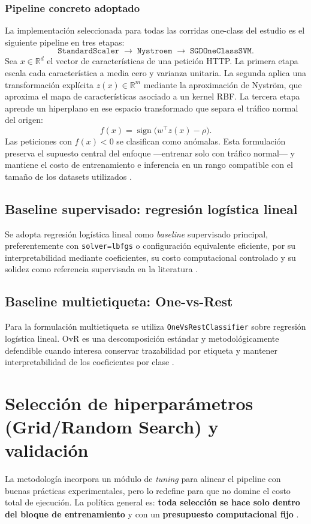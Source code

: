 \documentclass[12pt,oneside]{report}
\begin{document}
\subsubsection{Pipeline concreto adoptado}
La implementación seleccionada para todas las corridas one-class del estudio es el siguiente pipeline en tres etapas:
\[
\texttt{StandardScaler} \;\rightarrow\; \texttt{Nystroem} \;\rightarrow\; \texttt{SGDOneClassSVM}.
\]
Sea $x \in \mathbb{R}^d$ el vector de características de una petición HTTP. La primera etapa escala cada característica a media cero y varianza unitaria. La segunda aplica una transformación explícita $z(x) \in \mathbb{R}^m$ mediante la aproximación de Nyström, que aproxima el mapa de características asociado a un kernel RBF. La tercera etapa aprende un hiperplano en ese espacio transformado que separa el tráfico normal del origen:
\[
f(x)=\operatorname{sign}\big(w^\top z(x)-\rho\big).
\]
Las peticiones con $f(x) < 0$ se clasifican como anómalas. Esta formulación preserva el supuesto central del enfoque ---entrenar solo con tráfico normal--- y mantiene el costo de entrenamiento e inferencia en un rango compatible con el tamaño de los datasets utilizados \cite{sklearn_sgd_ocsvm,sklearn_kernel_approx}.

\subsection{Baseline supervisado: regresión logística lineal}
Se adopta regresión logística lineal como \textit{baseline} supervisado principal, preferentemente con \texttt{solver=lbfgs} o configuración equivalente eficiente, por su interpretabilidad mediante coeficientes, su costo computacional controlado y su solidez como referencia supervisada en la literatura \cite{islr_logreg,sklearn_logreg}.

\subsection{Baseline multietiqueta: One-vs-Rest}
Para la formulación multietiqueta se utiliza \texttt{OneVsRestClassifier} sobre regresión logística lineal. OvR es una descomposición estándar y metodológicamente defendible cuando interesa conservar trazabilidad por etiqueta y mantener interpretabilidad de los coeficientes por clase \cite{tsoumakas_multilabel_overview,rifkin_ova,sklearn_logreg}.

\section{Selección de hiperparámetros (Grid/Random Search) y validación}
La metodología incorpora un módulo de \textit{tuning} para alinear el pipeline con buenas prácticas experimentales, pero lo redefine para que no domine el costo total de ejecución. La política general es: \textbf{toda selección se hace solo dentro del bloque de entrenamiento} y con un \textbf{presupuesto computacional fijo} \cite{sklearn_randomsearch,sklearn_halving}.
\end{document}
